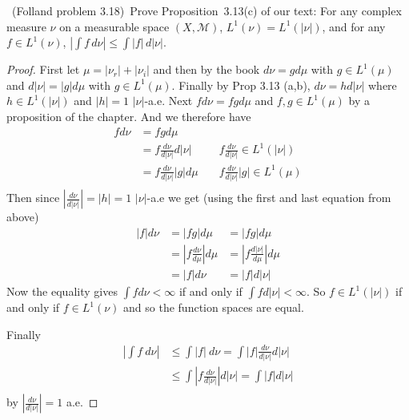 \documentclass[11pt]{amsart}
\theoremstyle{definition}
\numberwithin{theorem}{section}
\numberwithin{definition}{section}
\numberwithin{equation}{section}
\def\scriptm{{\mathcal M}}
\begin{document}
\medskip {}\ (Folland problem 3.18)\ 
Prove Proposition~3.13(c) of our text:
For any complex measure $\nu$ on a measurable space $(X,\scriptm)$,
$L^1(\nu)=L^1(|\nu|)$, and for any $f\in L^1(\nu)$,
$|\int f\,d\nu| \le \int |f|\,d|\nu|$.
\begin{proof}
	First let $\mu = |\nu_r| + |\nu_i|$ and then by the book
	$d\nu = g d\mu$ with $g \in L^1(\mu)$ and $d|\nu| = |g| d\mu$ with $g \in L^1(\mu).$
	Finally by Prop 3.13 (a,b), $d\nu = h d|\nu|$ where $h \in L^1(|\nu|)$ and $|h| = 1$ $|\nu|$-a.e.
	Next $f d\nu = fg d\mu$ and $f,g \in L^1(\mu)$ by a proposition of the chapter.
	And we therefore have
	\begin{equation*}
	  	\begin{aligned}
		f d\nu &= fg d\mu   	 \\
		&= f\frac{d \nu}{d |\nu|} d|\nu|&\;\;\;\ f \frac{d \nu}{d |\nu|} \in L^1(|\nu|) \\
		&=  f\frac{d \nu}{d |\nu|}  |g| d\mu &\;\;\;\ f\frac{d \nu}{d |\nu|}  |g|\in L^1(\mu) \\
	  	\end{aligned}
	  \end{equation*}  
	  Then since $|\frac{d \nu}{d |\nu|}|  = |h| =1$ $|\nu|$-a.e we get (using the first and last equation from above)
	  \begin{equation*}
	  \begin{aligned}
		|f| d\nu &= |fg| d\mu    &= |fg| d\mu	 \\
		&= |f \frac{d\nu}{d\mu}| d\mu &= |f \frac{d |\nu|}{d \mu}|d\mu \\
		&= |f| d\nu &= |f| d|\nu|
	  	\end{aligned}
	  \end{equation*}
	  Now the equality gives $\int f d\nu < \infty$  if and only if $\int f d|\nu| < \infty$. So $f \in L^1(|\nu|)$
	  if and only if $f \in L^1(\nu)$ and so the function spaces are equal.

	  Finally \begin{equation*}
	  	\begin{aligned}
	  		\left|\int f\ d\nu\right| &\leq \int |f|\ d\nu  = \int |f|\frac{d \nu}{d |\nu|} d|\nu| \\
	  		&\leq \int \left|f\frac{d \nu}{d |\nu|}\right| d|\nu| = \int |f| d|\nu| \\
	  	\end{aligned}
	  \end{equation*}
	  by $|\frac{d \nu}{d |\nu|}| =1$ a.e.
\end{proof}
\end{document}
